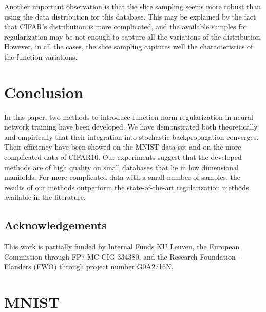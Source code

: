 \documentclass{article}
\begin{document}
Another important observation is that the slice sampling seems more robust than using the data distribution for this database. This may be explained by the fact that CIFAR's distribution is more complicated, and the available samples for regularization may be not enough to capture all the variations of the distribution. However, in all the cases, the slice sampling captures well the characteristics of the function variations. 

\section{Conclusion}
In this paper, two methods to introduce function norm regularization in neural network training have been developed. We have demonstrated both theoretically and empirically that their integration into stochastic backpropagation converges. Their efficiency have been showed on the  MNIST data set and on the more complicated data of CIFAR10. Our experiments suggest that the developed methods are of high quality on small databases that lie in low dimensional manifolds. For more complicated data with a small number of samples, the results of our methods outperform the state-of-the-art regularization methods available in the literature. 


\subsection*{Acknowledgements}

This   work   is   partially   funded   by   Internal   Funds
KU  Leuven,  the European Commission through FP7-MC-CIG
334380, and the Research Foundation - Flanders (FWO) through project number G0A2716N.


 

 






















\appendix

\section{MNIST}
\end{document}
